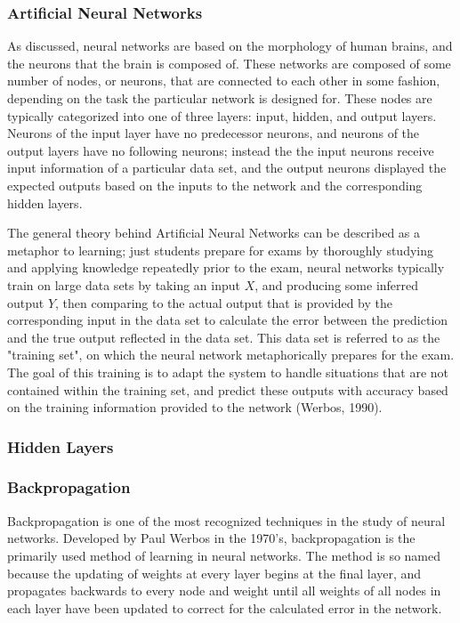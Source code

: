 \documentclass[11pt]{article}
\begin{document}
\subsubsection{Artificial Neural Networks}
As discussed, neural networks are based on the morphology of human brains, and the neurons that the brain is composed of. These networks are composed of some number of nodes, or neurons, that are connected to each other in some fashion, depending on the task the particular network is designed for. These nodes are typically categorized into one of three layers: input, hidden, and output layers. Neurons of the input layer have no predecessor neurons, and neurons of the output layers have no following neurons; instead the the input neurons receive input information of a particular data set, and the output neurons displayed the expected outputs based on the inputs to the network and the corresponding hidden layers.\par

The general theory behind Artificial Neural Networks can be described as a metaphor to learning; just students prepare for exams by thoroughly studying and applying knowledge repeatedly prior to the exam, neural networks typically train on large data sets by taking an input $X$, and producing some inferred output $Y$, then comparing to the actual output that is provided by the corresponding input in the data set to calculate the error between the prediction and the true output reflected in the data set. This data set is referred to as the "training set", on which the neural network  metaphorically prepares for the exam. The goal of this training is to adapt the system to handle situations that are not contained within the training set, and predict these outputs with accuracy based on the training information provided to the network (Werbos, 1990).\par

\subsubsection{Hidden Layers}

\subsubsection{Backpropagation}
Backpropagation is one of the most recognized techniques in the study of neural networks. Developed by Paul Werbos in the 1970's, backpropagation is the primarily used method of learning in neural networks. The method is so named because the updating of weights at every layer begins at the final layer, and propagates backwards to every node and weight until all weights of all nodes in each layer have been updated to correct for the calculated error in the network.
\end{document}
